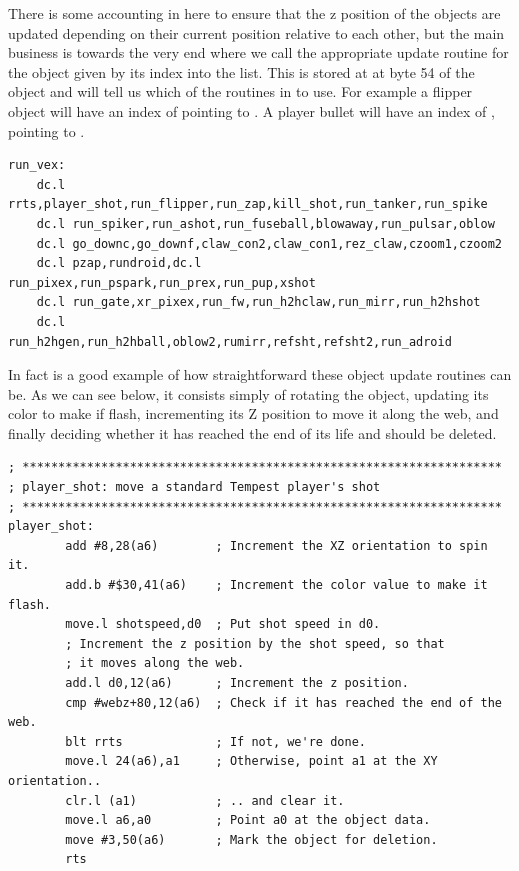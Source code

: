 There is some accounting in here to ensure that the z position of the objects are updated
depending on their current position relative to each other, but the main business is towards
the very end where we call the appropriate update routine for the object given by its index
into the  list. This is stored at at byte 54 of the object and will tell
us which of the routines in  to use. For example a flipper object will
have an index of  pointing to . A player bullet will have an
index of , pointing to .

\clearpage

\begin{lstlisting}
run_vex:
    dc.l rrts,player_shot,run_flipper,run_zap,kill_shot,run_tanker,run_spike
    dc.l run_spiker,run_ashot,run_fuseball,blowaway,run_pulsar,oblow
    dc.l go_downc,go_downf,claw_con2,claw_con1,rez_claw,czoom1,czoom2
    dc.l pzap,rundroid,dc.l run_pixex,run_pspark,run_prex,run_pup,xshot
    dc.l run_gate,xr_pixex,run_fw,run_h2hclaw,run_mirr,run_h2hshot
    dc.l run_h2hgen,run_h2hball,oblow2,rumirr,refsht,refsht2,run_adroid
\end{lstlisting}

In fact  is a good example of how straightforward these
object update routines can be. As we can see below, it consists simply of
rotating the object, updating its color to make if flash, incrementing its
Z position to move it along the web, and finally deciding whether it has
reached the end of its life and should be deleted.

\begin{lstlisting}
; *******************************************************************
; player_shot: move a standard Tempest player's shot
; *******************************************************************
player_shot:
        add #8,28(a6)        ; Increment the XZ orientation to spin it.
        add.b #$30,41(a6)    ; Increment the color value to make it flash.
        move.l shotspeed,d0  ; Put shot speed in d0.
        ; Increment the z position by the shot speed, so that
        ; it moves along the web.
        add.l d0,12(a6)      ; Increment the z position.
        cmp #webz+80,12(a6)  ; Check if it has reached the end of the web.
        blt rrts             ; If not, we're done.
        move.l 24(a6),a1     ; Otherwise, point a1 at the XY orientation..
        clr.l (a1)           ; .. and clear it.
        move.l a6,a0         ; Point a0 at the object data.
        move #3,50(a6)       ; Mark the object for deletion.
        rts
\end{lstlisting}
